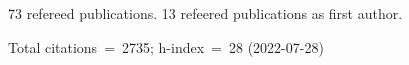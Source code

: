 73 refereed publications. 13 refeered publications as first author.

Total citations~=~2735; h-index~=~28 (2022-07-28)